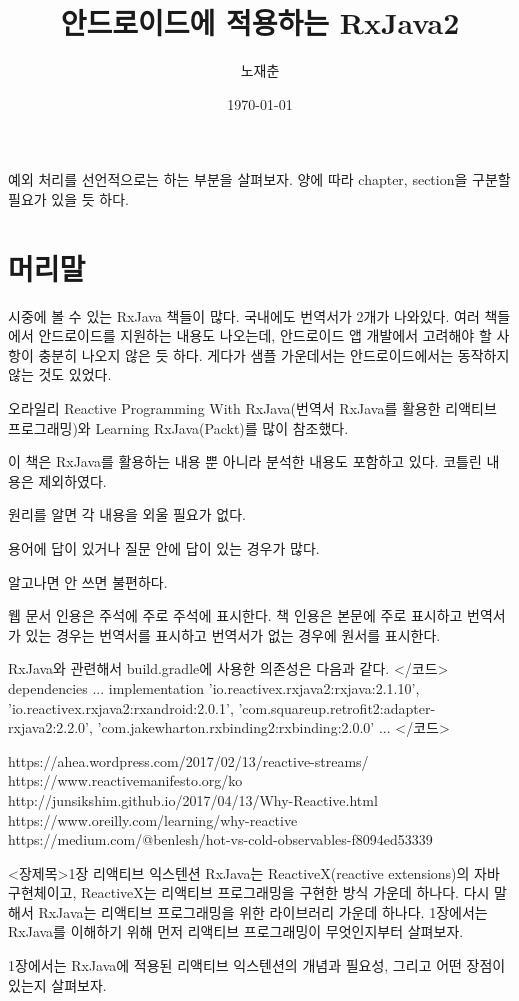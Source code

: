 \documentclass{book}
\title{안드로이드에 적용하는 RxJava2}
\author{노재춘}
\date{\today}
\begin{document}
 
\maketitle
예외 처리를 선언적으로는 하는 부분을 살펴보자.
양에 따라 chapter, section을 구분할 필요가 있을 듯 하다.
\chapter*{머리말}
시중에 볼 수 있는 RxJava 책들이 많다. 국내에도 번역서가 2개가 나와있다. 
여러 책들에서 안드로이드를 지원하는 내용도 나오는데, 안드로이드 앱 개발에서 고려해야 할 사항이 충분히 나오지 않은 듯 하다. 게다가 샘플 가운데서는 안드로이드에서는 동작하지 않는 것도 있었다.

오라일리 Reactive Programming With RxJava(번역서 RxJava를 활용한 리액티브 프로그래밍)와 Learning RxJava(Packt)를 많이 참조했다.

이 책은 RxJava를 활용하는 내용 뿐 아니라 분석한 내용도 포함하고 있다.
코틀린 내용은 제외하였다.

원리를 알면 각 내용을 외울 필요가 없다. 

용어에 답이 있거나 질문 안에 답이 있는 경우가 많다.

알고나면 안 쓰면 불편하다.
\tableofcontents

웹 문서 인용은 주석에 주로 주석에 표시한다. 책 인용은 본문에 주로 표시하고 번역서가 있는 경우는 번역서를 표시하고 번역서가 없는 경우에 원서를 표시한다. 


RxJava와 관련해서 build.gradle에 사용한 의존성은 다음과 같다.
</코드>
dependencies {
    ...
    implementation 'io.reactivex.rxjava2:rxjava:2.1.10',
        'io.reactivex.rxjava2:rxandroid:2.0.1',
        'com.squareup.retrofit2:adapter-rxjava2:2.2.0',
        'com.jakewharton.rxbinding2:rxbinding:2.0.0'
    ...
}
</코드>


https://ahea.wordpress.com/2017/02/13/reactive-streams/
https://www.reactivemanifesto.org/ko
http://junsikshim.github.io/2017/04/13/Why-Reactive.html
https://www.oreilly.com/learning/why-reactive
https://medium.com/@benlesh/hot-vs-cold-observables-f8094ed53339

<장제목>1장 리액티브 익스텐션
RxJava는 ReactiveX(reactive extensions)의 자바 구현체이고, ReactiveX는 리액티브 프로그래밍을 구현한 방식 가운데 하나다. 다시 말해서 RxJava는 리액티브 프로그래밍을 위한 라이브러리 가운데 하나다. 1장에서는 RxJava를 이해하기 위해 먼저 리액티브 프로그래밍이 무엇인지부터 살펴보자. 

1장에서는 RxJava에 적용된 리액티브 익스텐션의 개념과 필요성, 그리고 어떤 장점이 있는지 살펴보자.
\end{document}

